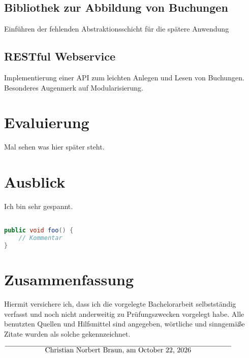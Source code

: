 \documentclass[12pt,oneside,a4paper,parskip]{scrbook}
\def\BaAuthor{Christian Norbert Braun}
\begin{document}
\section{Bibliothek zur Abbildung von Buchungen}
Einführen der fehlenden Abstraktionsschicht für die spätere Anwendung
\section{RESTful Webservice}
Implementierung einer API zum leichten Anlegen und Lesen von Buchungen. Besonderes Augenmerk auf Modularisierung.

\chapter{Evaluierung}
Mal sehen was hier später steht.

\chapter{Ausblick}
Ich bin sehr gespannt.

\begin{lstlisting}[label=lst:java,
				   language=java,
				   firstnumber=1,
				   caption=Beispiel für einen Quelltext]				   

public void foo() {				   
	// Kommentar
}
\end{lstlisting}

\chapter{Zusammenfassung}


\backmatter

\listoffigures
{}			

\listoftables


\printbibliography
{}				



Hiermit versichere ich, dass ich die vorgelegte Bachelorarbeit selbstständig verfasst und noch nicht anderweitig zu Prüfungszwecken vorgelegt habe. Alle benutzten Quellen und Hilfsmittel sind angegeben, wörtliche und sinngemäße Zitate wurden als solche gekennzeichnet.

\vspace{20pt}
\begin{flushright}
$\overline{~~~~~~~~~~~~~~~~~\mbox{\BaAuthor, am \today}~~~~~~~~~~~~~~~~~}$
\end{flushright}
\end{document}
